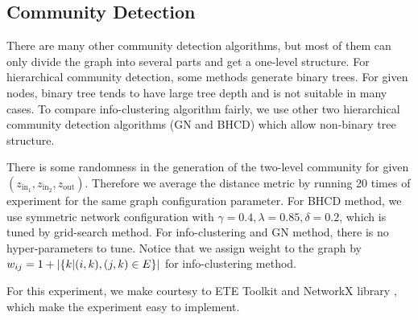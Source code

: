 \documentclass{article}
\begin{document}
\subsection{Community Detection}
There are many other community detection algorithms, but most of them can only divide the graph into several parts and get a one-level structure. For hierarchical community detection, some methods generate binary trees. For given nodes, binary tree tends to have large tree depth and is not suitable in many cases. To compare info-clustering algorithm fairly, we use other two hierarchical community detection algorithms (GN and BHCD) which allow non-binary tree structure.
 
There is some randomness in the generation of the two-level community for given $(z_{\mathrm{in}_1}, z_{\mathrm{in}_2}, z_{\mathrm{out}})$. Therefore we average the distance metric by running 20 times of experiment for the same graph configuration parameter. For BHCD method, we use symmetric network configuration with $\gamma = 0.4, \lambda=0.85, \delta=0.2$, which is tuned by grid-search method. For info-clustering and GN method, there is no hyper-parameters to tune. Notice that we assign weight to the graph by 
$w_{ij} = 1 + \lvert\{k | (i,k),(j,k) \in E \}\rvert$
for info-clustering method.

For this experiment, we make courtesy to ETE Toolkit\cite{ete3} and NetworkX library \cite{SciPyProceedings_11}, which make the experiment easy to implement.



\end{document}
